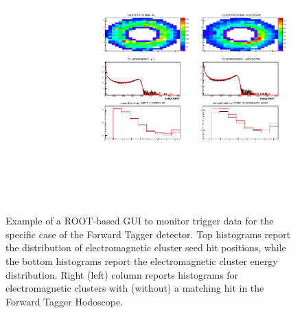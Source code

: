 \begin{figure}[t]
	\includegraphics[width=\textwidth]{img/plotAndrea.pdf}
	\caption{Example of a ROOT-based GUI to monitor trigger data for the specific case of the Forward Tagger detector. Top histograms report the distribution of electromagnetic cluster seed hit positions, while the bottom histograms report the electromagnetic cluster energy distribution. Right (left) column reports histograms for electromagnetic clusters  with (without) a matching hit in the Forward Tagger Hodoscope.}
	\label{fig:plot_andrea}
\end{figure}
